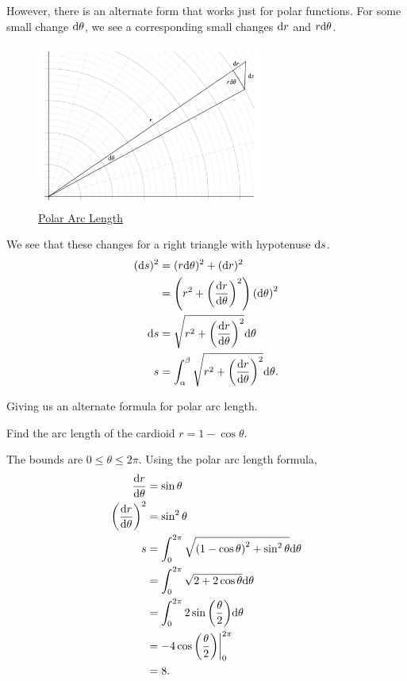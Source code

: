 However, there is an alternate form that works just for polar functions.
For some small change $\mathrm{d} \theta$, we see a corresponding small changes $\mathrm{d} r$ and $r\mathrm{d} \theta$.
\begin{figure}[H]
	\label{polar_area}
	\centering
	\includegraphics[width=0.66\textwidth]{./parametric_vector_polar/polar_length.png}
	\caption{\hyperref{}{}{}{Polar Arc Length}}
\end{figure}
We see that these changes for a right triangle with hypotenuse $\mathrm{d} s$.
\begin{align*}
	(\mathrm{d} s)^2 &= (r\mathrm{d} \theta)^2 + (\mathrm{d} r)^2 \\
	&= \left(r^2 + \left(\frac{\mathrm{d} r}{\mathrm{d} \theta}\right)^2\right)\left(\mathrm{d} \theta\right)^2 \\
	\mathrm{d} s &= \sqrt{r^2 + \left(\frac{\mathrm{d} r}{\mathrm{d} \theta}\right)^2}\mathrm{d} \theta \\
	s &= \int_{\alpha}^{\beta}{\sqrt{r^2 + \left(\frac{\mathrm{d} r}{\mathrm{d} \theta}\right)^2}\mathrm{d} \theta}.
\end{align*}

Giving us an alternate formula for polar arc length.

\begin{example}
	Find the arc length of the cardioid $r=1-\cos{\theta}$.
\end{example}
\begin{answer}
	The bounds are $0 \leq \theta \leq 2\pi$.
	Using the polar arc length formula,
	\begin{align*}
		\frac{\mathrm{d} r}{\mathrm{d} \theta} &= \sin{\theta} \\
		\left(\frac{\mathrm{d} r}{\mathrm{d} \theta}\right)^2 &= \sin^2{\theta} \\
		s &= \int_{0}^{2\pi}{\sqrt{\left(1-\cos{\theta}\right)^2+\sin^2{\theta}}\mathrm{d} \theta} \\
		&= \int_{0}^{2\pi}{\sqrt{2+2\cos{\theta}}\mathrm{d} \theta} \\
		&= \int_{0}^{2\pi}{2\sin{\left(\frac{\theta}{2}\right)}\mathrm{d} \theta} \\
		&= -4\cos{\left(\frac{\theta}{2}\right)}\biggr\rvert_{0}^{2\pi} \\
		&= 8.
	\end{align*}
\end{answer}
